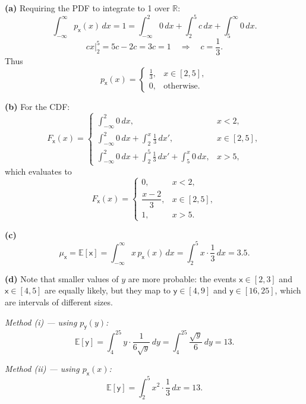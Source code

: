 \begin{solution}
    \textbf{(a)}
    Requiring the PDF to integrate to 1 over $\mathbb{R}$:
    \[
        \int_{-\infty}^{\infty} p_{\mathsf{x}}(x)\,dx
        = 1
        = \int_{-\infty}^{2} 0\,dx
          + \int_{2}^{5} c\,dx
          + \int_{5}^{\infty} 0\,dx.
    \]
    \[
        cx\big|_{2}^{5} = 5c - 2c = 3c = 1
        \quad\Longrightarrow\quad c = \frac{1}{3}.
    \]
    Thus
    \[
        p_{\mathsf{x}}(x) =
        \begin{cases}
            \tfrac{1}{3}, & x \in [2, 5], \\
            0,            & \text{otherwise.}
        \end{cases}
    \]

    \textbf{(b)}
    For the CDF:
    \[
        F_{\mathsf{x}}(x) =
        \begin{cases}
            \displaystyle
                \int_{-\infty}^{2} 0\,dx,
                & x < 2, \\[10pt]
            \displaystyle
                \int_{-\infty}^{2} 0\,dx + \int_{2}^{x} \tfrac{1}{3}\,dx',
                & x \in [2,5], \\[10pt]
            \displaystyle
                \int_{-\infty}^{2} 0\,dx
                + \int_{2}^{5} \tfrac{1}{3}\,dx'
                + \int_{5}^{x} 0\,dx,
                & x > 5,
        \end{cases}
    \]
    which evaluates to
    \[
        F_{\mathsf{x}}(x) =
        \begin{cases}
            0,              & x < 2,        \\[4pt]
            \dfrac{x-2}{3}, & x \in [2,5], \\[4pt]
            1,              & x > 5.
        \end{cases}
    \]

    \textbf{(c)}
    \[
        \mu_{\mathsf{x}} = \mathbb{E}[\mathsf{x}]
        = \int_{-\infty}^{\infty} x\, p_{\mathsf{x}}(x)\,dx
        = \int_{2}^{5} x \cdot \frac{1}{3}\,dx
        = 3.5.
    \]

    \textbf{(d)} Note that smaller values of $y$ are more probable: the events $\mathsf{x} \in [2,3]$ and $\mathsf{x} \in [4,5]$ are equally likely, but they map to $\mathsf{y} \in [4,9]$ and $\mathsf{y} \in
    [16,25]$, which are intervals of different sizes.

    \textit{Method (i) --- using $p_{\mathsf{y}}(y)$:}
    \[
        \mathbb{E}[\mathsf{y}]
        = \int_{4}^{25} y \cdot \frac{1}{6\sqrt{y}}\,dy
        = \int_{4}^{25} \frac{\sqrt{y}}{6}\,dy
        = 13.
    \]

    \textit{Method (ii) --- using $p_{\mathsf{x}}(x)$:}
    \[
        \mathbb{E}[\mathsf{y}]
        = \int_{2}^{5} x^{2} \cdot \frac{1}{3}\,dx
        = 13.
    \]
\end{solution}

